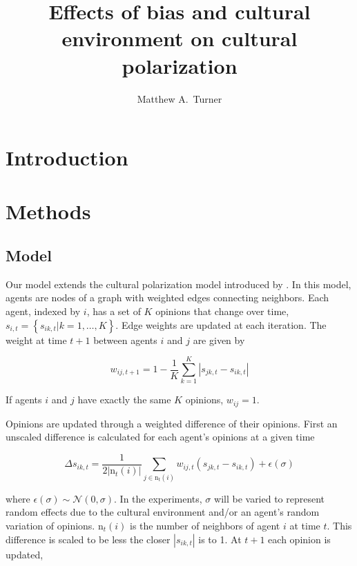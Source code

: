 \documentclass[11pt,letterpaper]{article}
\title{Effects of bias and cultural environment on cultural polarization}
\author{Matthew A.~Turner}
\begin{document}
\maketitle

\section{Introduction}
\label{sec:Introduction}

\section{Methods}
\label{sec:Methods}

\subsection{Model}
\label{sub:Model}

Our model extends the cultural polarization model introduced by 
. In this model, agents are nodes of a graph with weighted
edges connecting neighbors. Each agent, indexed by $i$, has a set of $K$ opinions 
that change over time, $s_{i,t} = \left\{ s_{ik,t} | k = 1, \ldots, K\right\}$.
Edge weights are updated at each iteration. The weight
at time $t+1$ between agents $i$ and $j$ are given by 

\begin{equation}
  w_{ij,t+1} = 1 - \frac{1}{K} \sum_{k=1}^K \left| s_{jk,t} - s_{ik,t} \right|
\end{equation}

\noindent
If agents $i$ and $j$ have exactly the same $K$ opinions, $w_{ij} = 1$. 

Opinions are updated through a weighted difference of their opinions. 
First an unscaled difference is calculated for each agent's opinions at a given time

\begin{equation}
  \Delta s_{ik,t} = \frac{1}{2 |\mathrm{n}_t(i)|} 
    \sum_{j \in \mathrm{n}_t(i)} w_{ij,t} \left(s_{jk,t} - s_{ik,t}\right) + \epsilon(\sigma)
\end{equation}

\noindent 
where $\epsilon(\sigma) \sim \mathcal{N}(0, \sigma)$. In the experiments,
$\sigma$ will be varied to represent random effects due to the cultural environment
and/or an agent's random variation of opinions.
$\mathrm{n}_t(i)$ is the number of neighbors of agent $i$ at time $t$.
This difference is scaled to be less the closer $|s_{ik,t}|$ is to 1. At $t+1$
each opinion is updated,
\end{document}
